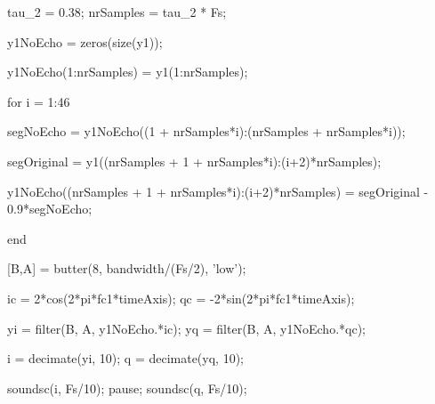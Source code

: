 \documentclass[10pt,twocolumn]{article}
\begin{document}
\begin{spverbatim}
tau_2 = 0.38;     %
nrSamples = tau_2 * Fs;    %

y1NoEcho = zeros(size(y1));

y1NoEcho(1:nrSamples) = y1(1:nrSamples);

for i = 1:46

    segNoEcho = y1NoEcho((1 + nrSamples*i):(nrSamples + nrSamples*i));  

    segOriginal = y1((nrSamples + 1 + nrSamples*i):(i+2)*nrSamples);          
    
    y1NoEcho((nrSamples + 1 + nrSamples*i):(i+2)*nrSamples) 
    							= segOriginal - 0.9*segNoEcho;  

end

[B,A] = butter(8, bandwidth/(Fs/2), 'low');

ic = 2*cos(2*pi*fc1*timeAxis);
qc = -2*sin(2*pi*fc1*timeAxis);

yi = filter(B, A, y1NoEcho.*ic);
yq = filter(B, A, y1NoEcho.*qc);

i = decimate(yi, 10);
q = decimate(yq, 10);

soundsc(i, Fs/10);  %
pause;
soundsc(q, Fs/10);  %


\end{spverbatim}
\end{document}

